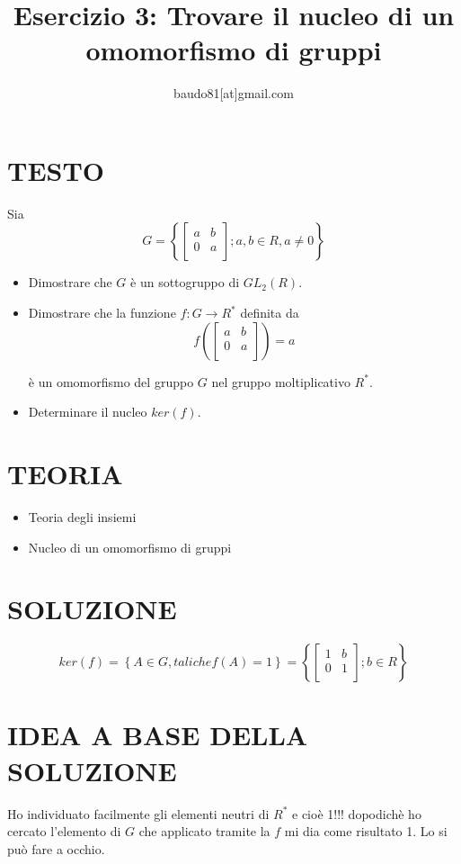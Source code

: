 \documentclass[a4paper,10pt]{article}
\title{Esercizio 3: Trovare il nucleo di un omomorfismo di gruppi}
\author{baudo81[at]gmail.com}
\begin{document}
\maketitle

\section{TESTO}
Sia  
\[
  G = \left\{ \left[ {\begin{array}{cc}
   a & b \\
   0 & a \\    
   \end{array} } 
   \right] ; a, b \in R, a \ne 0 \right\} 
\]

\begin{itemize}
 \item Dimostrare che $G$ è un sottogruppo di $GL_{2}(R)$.
 \item Dimostrare che la funzione $f:G\longrightarrow R^{*}$ definita da \[
  f \left( \left[ {\begin{array}{cc}
   a & b \\
   0 & a \\    
   \end{array} } 
   \right] \right) = a
\]
 
è un omomorfismo del gruppo $G$ nel gruppo moltiplicativo $R^{*}$.

\item Determinare il nucleo $ker(f)$.

\end{itemize}

\section{TEORIA}
\begin{itemize}
 \item Teoria degli insiemi
 \item Nucleo di un omomorfismo di gruppi
\end{itemize}


\section{SOLUZIONE}
\[
 ker(f) = \left\{ A \in G, tali che f(A) = 1 \right\} = \left\{ \left[ \begin{array}{cc}
   1 & b \\
   0 & 1 \\    
   \end{array} \right]; b \in R \right\} 
\]

\section{IDEA A BASE DELLA SOLUZIONE}
Ho individuato facilmente gli elementi neutri di $R^{*}$ e cioè 1!!! dopodichè ho cercato l'elemento di 
$G$ che applicato tramite la $f$ mi dia come risultato 1. Lo si può fare a occhio.
\end{document}

